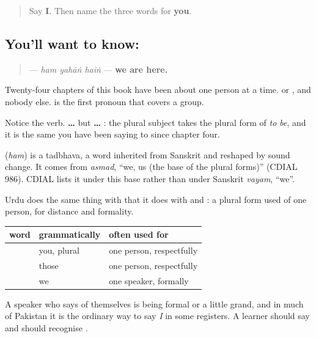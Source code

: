 \label{lesson:UR-C25-hum}



\begin{quote}
Say \textbf{I}. Then name the three words for \textbf{you}.
\end{quote}

\subsection*{You'll want to know: }
\begin{quote}
\textbf{  } — \emph{ham yahāṅ haiṅ} — \textbf{we are here.}
\end{quote}

Twenty-four chapters of this book have been about one person at a time. \textbf{} or \textbf{}, and nobody else. \textbf{} is the first pronoun that covers a group.

Notice the verb. \textbf{ … } but \textbf{ … }: the plural subject takes the plural form of \emph{to be}, and it is the same \textbf{} you have been saying to \textbf{} since chapter four.

\begin{cousinweb}
\textbf{} (\emph{ham}) is a tadbhava, a word inherited from Sanskrit and reshaped by sound change. It comes from \emph{asmad}, \textquotedblleft{}we, us (the base of the plural forms)\textquotedblright{} (CDIAL 986). CDIAL lists it under this base rather than under Sanskrit \emph{vayam}, \textquotedblleft{}we\textquotedblright{}.
\end{cousinweb}

\begin{grammarlens}[title={Grammar Lens: a \textquotedblleft{}we\textquotedblright{} that is sometimes one person}]
Urdu does the same thing with \textbf{} that it does with \textbf{} and \textbf{}: a plural form used of one person, for distance and formality.

\noindent
\begin{tabularx}{\linewidth}{@{}>{\raggedright\arraybackslash}X>{\raggedright\arraybackslash}X>{\raggedright\arraybackslash}X@{}}
\toprule
\textbf{word} & \textbf{grammatically} & \textbf{often used for} \\
\midrule
\textbf{\ur{آپ}} & you, plural & one person, respectfully \\
\textbf{\ur{ان}} & those & one person, respectfully \\
\textbf{\ur{ہم}} & we & one speaker, formally \\
\bottomrule
\end{tabularx}

A speaker who says \textbf{} of themselves is being formal or a little grand, and in much of Pakistan it is the ordinary way to say \emph{I} in some registers. A learner should say \textbf{} and should recognise \textbf{}.
\end{grammarlens}

